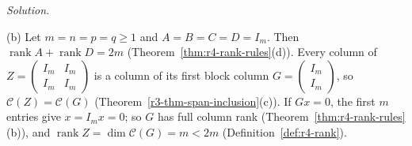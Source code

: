 \documentclass[12pt]{article}
\DeclareMathOperator{\rank}{rank}
\theoremstyle{definition}
\newenvironment{solution}{\par\noindent\textit{Solution.}\ }{\par\smallskip}
\begin{document}
\begin{solution}
\begin{itemize}
\end{itemize}
(b) Let \(m=n=p=q\geqslant1\) and \(A=B=C=D=I_m\). Then \(\rank A+\rank D=2m\) (Theorem~\ref{thm:r4-rank-rules}(d)). Every
column of \(Z=\left(\begin{smallmatrix}I_m&I_m\\I_m&I_m\end{smallmatrix}\right)\) is a column of its first block column
\(G=\left(\begin{smallmatrix}I_m\\I_m\end{smallmatrix}\right)\), so \(\mathcal C(Z)=\mathcal C(G)\)
(Theorem~\ref{r3-thm-span-inclusion}(c)). If \(Gx=0\), the first \(m\) entries give \(x=I_mx=0\); so \(G\) has full column
rank (Theorem~\ref{thm:r4-rank-rules}(b)), and \(\rank Z=\dim\mathcal C(G)=m<2m\) (Definition~\ref{def:r4-rank}).
\end{solution}
\end{document}
